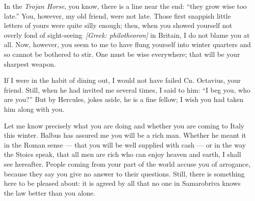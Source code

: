 

 In the \textit{Trojan Horse}, you know, there is a line near the end: ``they grow wise too late.'' You, however, my old friend, were not late. Those first snappish little letters of yours were quite silly enough; then, when you showed yourself not overly fond of sight-seeing\ \textit{[Greek: philotheoron]} in Britain, I do not blame you at all. Now, however, you seem to me to have flung yourself into winter quarters and so cannot be bothered to stir. One must be wise everywhere; that will be your sharpest weapon.

 If I were in the habit of dining out, I would not have failed Cn. Octavius, your friend. Still, when he had invited me several times, I said to him: ``I beg you, who are you?'' But by Hercules, jokes aside, he is a fine fellow; I wish you had taken him along with you.

 Let me know precisely what you are doing and whether you are coming to Italy this winter. Balbus has assured me you will be a rich man. Whether he meant it in the Roman sense --- that you will be well supplied with cash --- or in the way the Stoics speak, that all men are rich who can enjoy heaven and earth, I shall see hereafter. People coming from your part of the world accuse you of arrogance, because they say you give no answer to their questions. Still, there is something here to be pleased about: it is agreed by all that no one in Samarobriva knows the law better than you alone.
